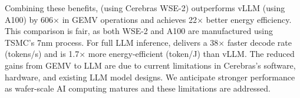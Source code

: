 Combining these benefits, \sys (using Cerebras WSE-2) outperforms vLLM (using A100) by 606$\times$ in GEMV operations and achieves 22$\times$ better energy efficiency. This comparison is fair, as both WSE-2 and A100 are manufactured using TSMC’s 7nm process. For full LLM inference, \sys delivers a 38$\times$ faster decode rate (tokens/s) and is 1.7$\times$ more energy-efficient (token/J) than vLLM. The reduced gains from GEMV to LLM are due to current limitations in Cerebras’s software, hardware, and existing LLM model designs. We anticipate stronger performance as wafer-scale AI computing matures and these limitations are addressed.